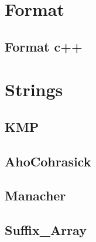 \documentclass[12pt]{extarticle}
\author{
  Ankesh Gupta, Ronak Agarwal, Anant Chhajwani  
}
\begin{document}
\maketitle
\begin{multicols*}{2}
\setlength{\parskip}{0.0in}
\tableofcontents
\setlength{\parskip}{0.1in}
\section{Format}

\subsection{Format c++} %


% 



\section{Strings}

\subsection{KMP} %


\subsection{AhoCohrasick} %


\subsection{Manacher}


\subsection{Suffix\_Array} %



\end{multicols*}
\end{document}
